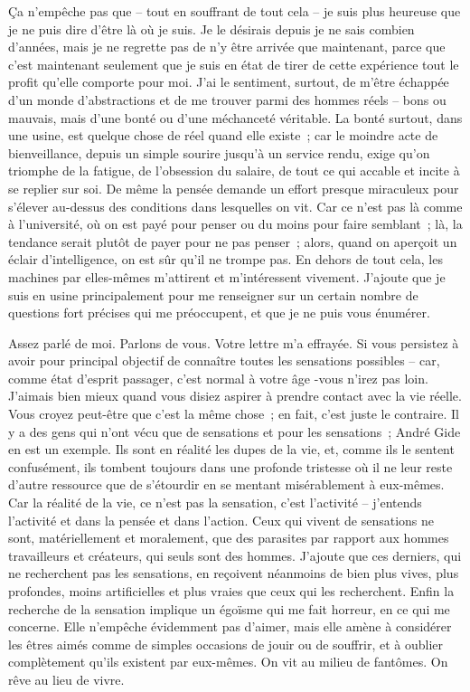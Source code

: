 \documentclass[french,twoside]{book} %
\begin{document}
Ça n'empêche pas que – tout en souffrant de tout cela – je suis plus heureuse que je ne puis dire d'être là où je suis. Je le désirais depuis je ne sais combien d'années, mais je ne regrette pas de n'y être arrivée que maintenant, parce que c'est maintenant seulement que je suis en état de tirer de cette expérience tout le profit qu'elle comporte pour moi. J'ai le sentiment, surtout, de m'être échappée d'un monde d'abstractions et de me trouver parmi des hommes réels – bons ou mauvais, mais d'une bonté ou d'une méchanceté véritable. La bonté surtout, dans une usine, est quelque chose de réel quand elle existe ; car le moindre acte de bienveillance, depuis un simple sourire jusqu'à un service rendu, exige qu'on triomphe de la fatigue, de l'obsession du salaire, de tout ce qui accable et incite à se replier sur soi. De même la pensée demande un effort presque miraculeux pour s'élever au-dessus des conditions dans lesquelles on vit. Car ce n'est pas là comme à l'université, où on est payé pour penser ou du moins pour faire semblant ; là, la tendance serait plutôt de payer pour ne pas penser ; alors, quand on aperçoit un éclair d'intelligence, on est sûr qu'il ne trompe pas. En dehors de tout cela, les machines par elles-mêmes m'attirent et m'intéressent vivement. J'ajoute que je suis en usine principalement pour me renseigner sur un certain nombre de questions fort précises qui me préoccupent, et que je ne puis vous énumérer.\par
Assez parlé de moi. Parlons de vous. Votre lettre m'a effrayée. Si vous persistez à avoir pour principal objectif de connaître toutes les sensations possibles – car, comme état d'esprit passager, c'est normal à votre âge -vous n'irez pas loin. J'aimais bien mieux quand vous disiez aspirer à prendre contact avec la vie réelle. Vous croyez peut-être que c'est la même chose ; en fait, c'est juste le contraire. Il y a des gens qui n'ont vécu que de sensations et pour les sensations ; André Gide en est un exemple. Ils sont en réalité les dupes de la vie, et, comme ils le sentent confusément, ils tombent toujours dans une profonde tristesse où il ne leur reste d'autre ressource que de s'étourdir en se mentant misérablement à eux-mêmes. Car la réalité de la vie, ce n'est pas la sensation, c'est l'activité – j'entends l'activité et dans la pensée et dans l'action. Ceux qui vivent de sensations ne sont, matériellement et moralement, que des parasites par rapport aux hommes travailleurs et créateurs, qui seuls sont des hommes. J'ajoute que ces derniers, qui ne recherchent pas les sensations, en reçoivent néanmoins de bien plus vives, plus profondes, moins artificielles et plus vraies que ceux qui les recherchent. Enfin la recherche de la sensation implique un égoïsme qui me fait horreur, en ce qui me concerne. Elle n'empêche évidemment pas d'aimer, mais elle amène à considérer les êtres aimés comme de simples occasions de jouir ou de souffrir, et à oublier complètement qu'ils existent par eux-mêmes. On vit au milieu de fantômes. On rêve au lieu de vivre.\par
\end{document}
